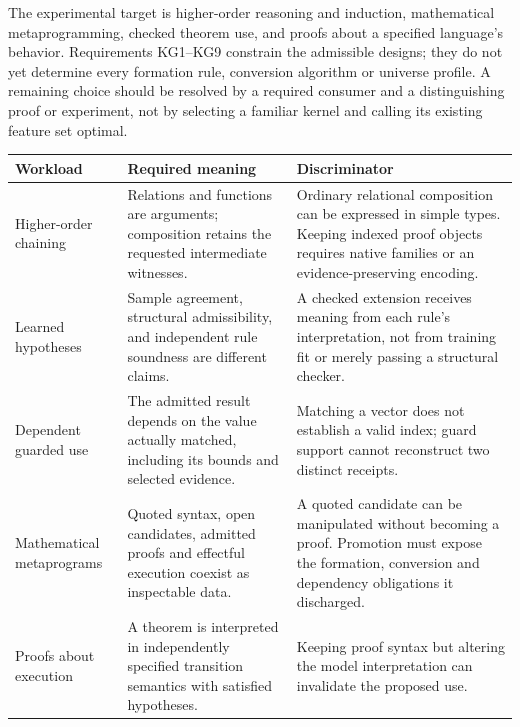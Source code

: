 \documentclass[11pt]{article}
\theoremstyle{definition}
\theoremstyle{remark}
\begin{document}
The experimental target is higher-order reasoning and induction, mathematical
metaprogramming, checked theorem use, and proofs about a specified language's
behavior. Requirements KG1--KG9 constrain the admissible designs; they do not
yet determine every formation rule, conversion algorithm or universe profile.
A remaining choice should be resolved by a required consumer and a
distinguishing proof or experiment, not by selecting a familiar kernel and
calling its existing feature set optimal.

\begin{center}\small
\begin{tabular}{>{\raggedright\arraybackslash}p{}
  >{\raggedright\arraybackslash}p{}
  >{\raggedright\arraybackslash}p{}}
\textbf{Workload} & \textbf{Required meaning} & \textbf{Discriminator} \\
\hline
Higher-order chaining & Relations and functions are arguments; composition
  retains the requested intermediate witnesses. & Ordinary relational
  composition can be expressed in simple types. Keeping indexed proof
  objects requires native families or an evidence-preserving encoding. \\
Learned hypotheses & Sample agreement, structural admissibility, and
  independent rule soundness are different claims. & A checked extension
  receives meaning from each rule's interpretation, not from training fit
  or merely passing a structural checker. \\
Dependent guarded use & The admitted result depends on the value actually
  matched, including its bounds and selected evidence. & Matching a vector
  does not establish a valid index; guard support cannot reconstruct two
  distinct receipts. \\
Mathematical metaprograms & Quoted syntax, open candidates, admitted proofs
  and effectful execution coexist as inspectable data. & A quoted candidate
  can be manipulated without becoming a proof. Promotion must expose the
  formation, conversion and dependency obligations it discharged. \\
Proofs about execution & A theorem is interpreted in independently specified
  transition semantics with satisfied hypotheses. & Keeping proof syntax
  but altering the model interpretation can invalidate the proposed use. \\
\end{tabular}
\end{center}
\end{document}
